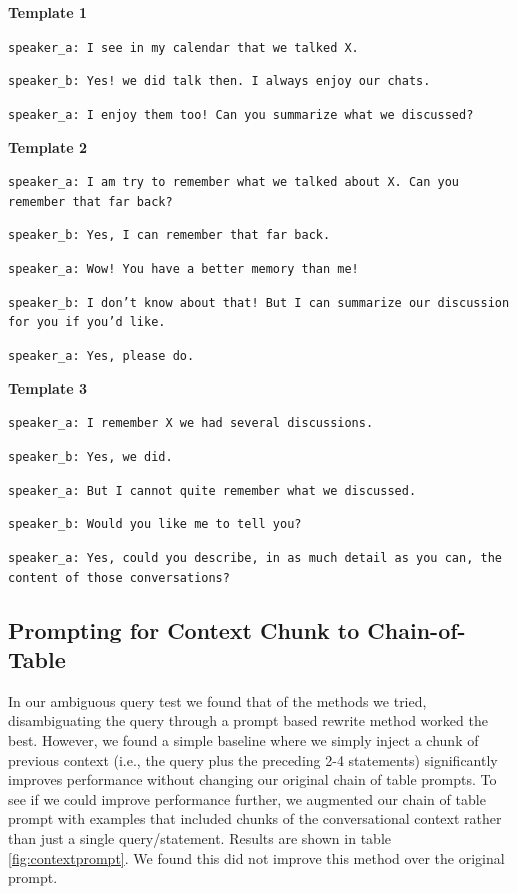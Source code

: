 \documentclass{article}
\begin{document}
\textbf{Template 1}

\texttt{speaker\_a: I see in my calendar that we talked X.}

\texttt{speaker\_b: Yes! we did talk then. I always enjoy our chats.}

\texttt{speaker\_a: I enjoy them too! Can you summarize what we discussed?}
\newline

\textbf{Template 2}

\texttt{speaker\_a: I am try to remember what we talked about X. Can you remember that far back?}

\texttt{speaker\_b: Yes, I can remember that far back.}

\texttt{speaker\_a: Wow! You have a better memory than me!}

\texttt{speaker\_b: I don't know about that! But I can summarize our discussion for you if you'd like.}

\texttt{speaker\_a: Yes, please do.}
\newline

\textbf{Template 3}

\texttt{speaker\_a: I remember X we had several discussions.}

\texttt{speaker\_b: Yes, we did.}

\texttt{speaker\_a: But I cannot quite remember what we discussed.}

\texttt{speaker\_b: Would you like me to tell you?}

\texttt{speaker\_a: Yes, could you describe, in as much detail as you can, the content of those conversations?}

\subsection{Prompting for Context Chunk to Chain-of-Table}
In our ambiguous query test we found that of the methods we tried, disambiguating the query through a prompt based rewrite method worked the best. However, we found a simple baseline where we simply inject a chunk of previous context (i.e., the query plus the preceding 2-4 statements) significantly improves performance without changing our original chain of table prompts. To see if we could improve performance further, we augmented our chain of table prompt with examples that included chunks of the conversational context rather than just a single query/statement. Results are shown in table \ref{fig:contextprompt}. We found this did not improve this method over the original prompt.
\end{document}
